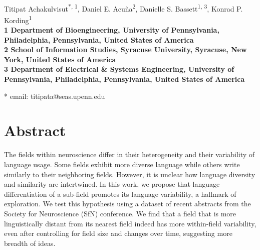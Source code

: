 \documentclass[10pt,letterpaper]{article}
\date{}
\begin{document}
\vspace*{0.35in}

\begin{flushleft}
{\Large
\textbf{}
}
\newline
\\

Titipat Achakulvisut\textsuperscript{*, 1},
Daniel E. Acuña\textsuperscript{2},
Danielle S. Bassett\textsuperscript{1, 3},
Konrad P. Kording\textsuperscript{1}
\\
\bigskip
\bf{1} Department of Bioengineering, University of Pennsylvania, Philadelphia, Pennsylvania, United States of America
\\
\bf{2} School of Information Studies, Syracuse University, Syracuse, New York, United States of America
\\
\bf{3} Department of Electrical \& Systems Engineering, University of Pennsylvania, Philadelphia, Pennsylvania, United States of America
\\
\bigskip


* email: titipata@seas.upenn.edu

\end{flushleft}
\section*{Abstract}
The fields within neuroscience differ in their heterogeneity and their variability of language usage. Some fields exhibit more diverse language while others write similarly to their neighboring fields. However, it is unclear how language diversity and similarity are intertwined. In this work, we propose that language differentiation of a sub-field promotes its language variability, a hallmark of exploration. We test this hypothesis using a dataset of recent abstracts from the Society for Neuroscience (SfN) conference. We find that a field that is more linguistically distant from its nearest field indeed has more within-field variability, even after controlling for field size and changes over time, suggesting more breadth of ideas.
\end{document}
